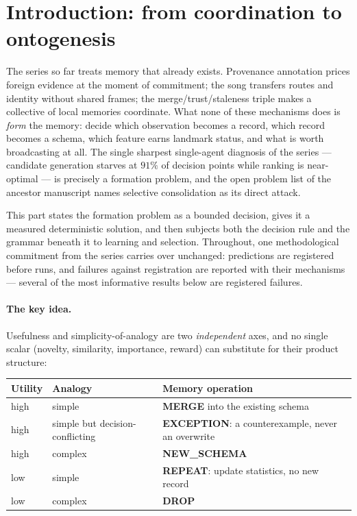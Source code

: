 \documentclass{article}
\begin{document}
\FloatBarrier
\section{Introduction: from coordination to ontogenesis}
\label{p5:sec:intro}

The series so far treats memory that already exists. Provenance
annotation prices foreign evidence at the moment of commitment; the
song transfers routes and identity without shared frames; the
merge/trust/staleness triple makes a collective of local memories
coordinate. What none of these mechanisms does is \emph{form} the
memory: decide which observation becomes a record, which record
becomes a schema, which feature earns landmark status, and what is
worth broadcasting at all. The single sharpest single-agent diagnosis
of the series --- candidate generation starves at $91\%$ of decision
points while ranking is near-optimal --- is precisely a formation
problem, and the open problem list of the ancestor manuscript names
selective consolidation as its direct attack.

This part states the formation problem as a bounded decision, gives
it a measured deterministic solution, and then subjects both the
decision rule and the grammar beneath it to learning and selection.
Throughout, one methodological commitment from the series carries
over unchanged: predictions are registered before runs, and failures
against registration are reported with their mechanisms --- several
of the most informative results below are registered failures.

\paragraph{The key idea.} Usefulness and simplicity-of-analogy are
two \emph{independent} axes, and no single scalar (novelty,
similarity, importance, reward) can substitute for their product
structure:

\begin{center}
\small
\begin{tabular}{lll}
\toprule
Utility & Analogy & Memory operation \\
\midrule
high & simple & \textbf{MERGE} into the existing schema \\
high & simple but decision-conflicting & \textbf{EXCEPTION}: a
counterexample, never an overwrite \\
high & complex & \textbf{NEW\_SCHEMA} \\
low & simple & \textbf{REPEAT}: update statistics, no new record \\
low & complex & \textbf{DROP} \\
\bottomrule
\end{tabular}
\end{center}
\end{document}
